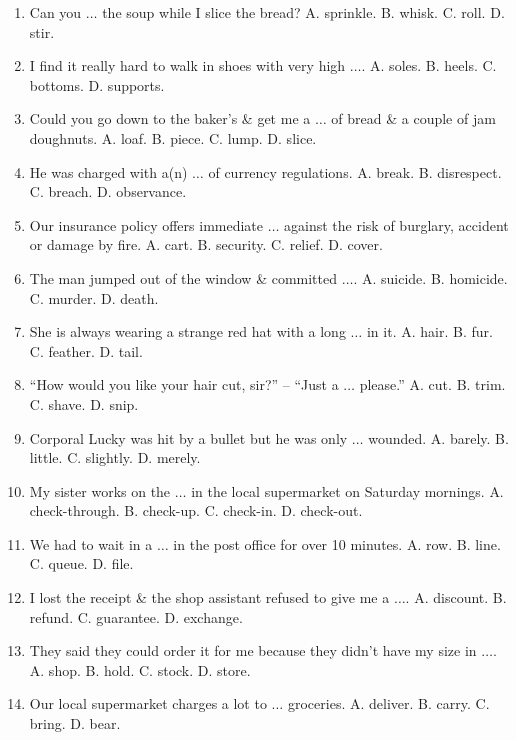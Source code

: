 \documentclass{article}
\numberwithin{equation}{section}
\begin{document}
\begin{enumerate}[leftmargin=8mm]
	\item Can you $\ldots$ the soup while I slice the bread? {\sf A.} sprinkle. {\sf B.} whisk. {\sf C.} roll. {\sf D.} stir.
	\item I find it really hard to walk in shoes with very high $\ldots$. {\sf A.} soles. {\sf B.} heels. {\sf C.} bottoms. {\sf D.} supports.
	\item Could you go down to the baker's \& get me a $\ldots$ of bread \& a couple of jam doughnuts. {\sf A.} loaf. {\sf B.} piece. {\sf C.} lump. {\sf D.} slice.
	\item He was charged with a(n) $\ldots$ of currency regulations. {\sf A.} break. {\sf B.} disrespect. {\sf C.} breach. {\sf D.} observance.
	\item Our insurance policy offers immediate $\ldots$ against the risk of burglary, accident or damage by fire. {\sf A.} cart. {\sf B.} security. {\sf C.} relief. {\sf D.} cover.
	\item The man jumped out of the window \& committed $\ldots$. {\sf A.} suicide. {\sf B.} homicide. {\sf C.} murder. {\sf D.} death.
	\item She is always wearing a strange red hat with a long $\ldots$ in it. {\sf A.} hair. {\sf B.} fur. {\sf C.} feather. {\sf D.} tail.
	\item ``How would you like your hair cut, sir?'' -- ``Just a $\ldots$ please.'' {\sf A.} cut. {\sf B.} trim. {\sf C.} shave. {\sf D.} snip.
	\item Corporal Lucky was hit by a bullet but he was only $\ldots$ wounded. {\sf A.} barely. {\sf B.} little. {\sf C.} slightly. {\sf D.} merely.
	\item My sister works on the $\ldots$ in the local supermarket on Saturday mornings. {\sf A.} check-through. {\sf B.} check-up. {\sf C.} check-in. {\sf D.} check-out.
	\item We had to wait in a $\ldots$ in the post office for over 10 minutes. {\sf A.} row. {\sf B.} line. {\sf C.} queue. {\sf D.} file.
	\item I lost the receipt \& the shop assistant refused to give me a $\ldots$. {\sf A.} discount. {\sf B.} refund. {\sf C.} guarantee. {\sf D.} exchange.
	\item They said they could order it for me because they didn't have my size in $\ldots$. {\sf A.} shop. {\sf B.} hold. {\sf C.} stock. {\sf D.} store.
	\item Our local supermarket charges a lot to $\ldots$ groceries. {\sf A.} deliver. {\sf B.} carry. {\sf C.} bring. {\sf D.} bear.

\end{enumerate}
\end{document}
